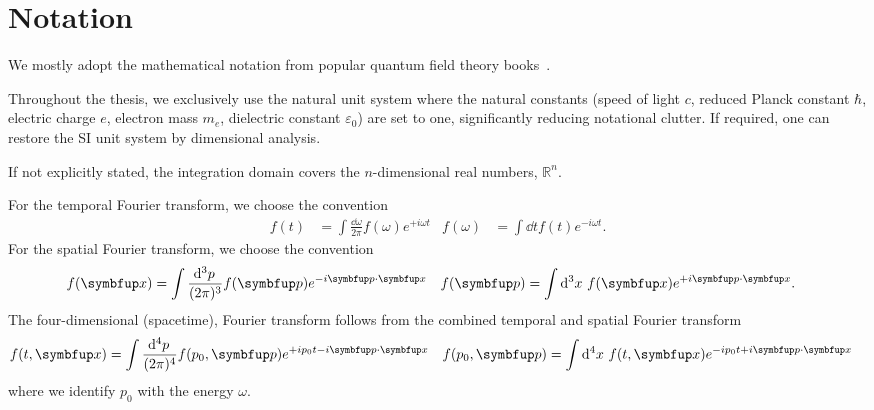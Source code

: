 \section*{Notation}

We mostly adopt the mathematical notation from popular quantum field theory books~\cite{Weinberg1995,Peskin1995}.

Throughout the thesis, we exclusively use the natural unit system where the natural constants (speed of light $c$, reduced Planck constant $\hbar$, electric charge $e$, electron mass $m_e$, dielectric constant $\varepsilon_0$) are set to one, significantly reducing notational clutter.
If required, one can restore the SI unit system by dimensional analysis.

If not explicitly stated, the integration domain covers the $n$-dimensional real numbers, $\mathbb{R}^n$.

For the temporal Fourier transform, we choose the convention
\begin{align*}
	f(t)
	&=
	\int\frac{\dd{\omega}}{2\pi}
	f(\omega)
	e^{+i\omega t}
	&
	f(\omega)
	&=
	\int\dd{t}
	f(t)
	e^{-i\omega t}
	.
\end{align*}
For the spatial Fourier transform, we choose the convention
\begin{align*}
	f(\vb{x})
	&=
	\int\frac{\dd[3]{p}}{(2\pi)^3}
	f(\vb{p})
	e^{-i\vb{p}\vdot\vb{x}}
	&
	f(\vb{p})
	&=
	\int\dd[3]{x}
	f(\vb{x})
	e^{+i\vb{p}\vdot\vb{x}}
	.
\end{align*}
The four-dimensional (spacetime), Fourier transform follows from the combined temporal and spatial Fourier transform
\begin{align*}
	f(t,\vb{x})
	&=
	\int\frac{\dd[4]{p}}{(2\pi)^4}
	f(p_0,\vb{p})
	e^{+ip_0 t-i\vb{p}\vdot\vb{x}}
	&
	f(p_0,\vb{p})
	&=
	\int\dd[4]{x}
	f(t,\vb{x})
	e^{-ip_0 t+i\vb{p}\vdot\vb{x}}
\end{align*}
where we identify $p_0$ with the energy $\omega$.

